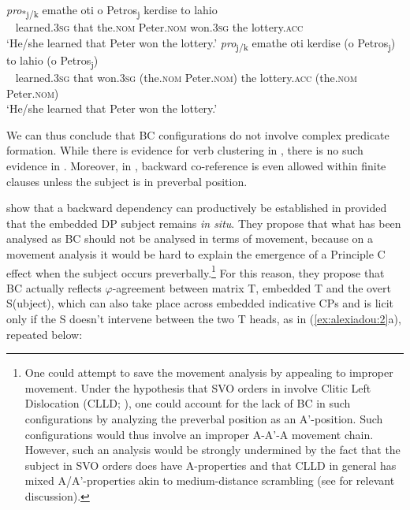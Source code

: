 \documentclass[output=paper]{langsci/langscibook}
\begin{document}
\ea%
    \label{ex:alexiadou:25}
    \ea\label{ex:alexiadou:25a}
    \gll \textit{pro}\textsubscript{*j/k}  emathe   oti   o Petros\textsubscript{j}   kerdise   to lahio \\
         ~ learned{}.\textsc{3sg}   that the.\textsc{nom} Peter{}.\textsc{nom}   won{}.\textsc{3sg} the lottery{}.\textsc{acc} \\
    \glt ‘He/she learned that Peter won the lottery.’
    \ex\label{ex:alexiadou:25b}
        \gll \textit{pro}\textsubscript{j/k}  emathe   oti   kerdise (o Petros\textsubscript{j}) to lahio (o Petros\textsubscript{j})          \\
        ~     learned{}.\textsc{3sg}    that     won{}.\textsc{3sg} (the.\textsc{nom} Peter{}.\textsc{nom}) the lottery{}.\textsc{acc}  (the.\textsc{nom} Peter{}.\textsc{nom})        \\
        \glt ‘He/she learned that Peter won the lottery.’
    \z
\z

We can thus conclude that  BC configurations do not involve complex predicate formation. While there is evidence for verb clustering in , there is no such evidence in . Moreover, in , backward co-reference is even allowed within finite clauses unless the subject is in preverbal position.

\citet{Tsakali2017} show that a backward dependency can productively be established in  provided that the embedded DP subject remains \textit{in situ}. They propose that what has been analysed as BC should not be analysed in terms of movement, because on a movement analysis it would be hard to explain the emergence of a Principle C effect when the subject occurs preverbally.\footnote{One could attempt to save the movement analysis by appealing to improper movement. Under the hypothesis that SVO orders in  involve Clitic Left Dislocation (CLLD; \citealt{Alexiadou1998}), one could account for the lack of BC in such configurations by analyzing the preverbal position as an A’-position. Such configurations would thus involve an improper A-A’-A movement chain. However, such an analysis would be strongly undermined by the fact that the subject in SVO orders does have A-properties and that CLLD in general has mixed A\slash A’-properties akin to medium-distance scrambling (see \citealt{Miyagawa2017} for relevant discussion).}  For this reason, they propose that  BC actually reflects $\varphi ${}-agreement between matrix T, embedded T and the overt S(ubject), which can also take place across embedded indicative CPs and is licit only if the S doesn’t intervene between the two T heads, as in (\ref{ex:alexiadou:2}a), repeated below:
\end{document}
